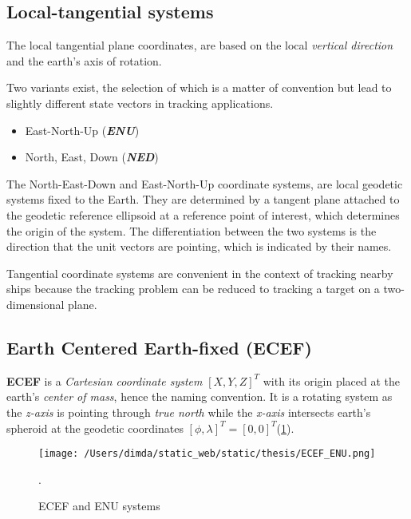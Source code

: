 \subsection{Local-tangential systems}

The local tangential plane coordinates, are based on the local \emph{vertical direction} and the earth's axis of rotation.

Two variants exist, the selection of which is a matter of convention but lead to slightly different state vectors in tracking applications.



\begin{itemize}
	\item East-North-Up (\textbf{\emph{ENU}})
	\item North, East, Down (\textbf{\emph{NED}})
\end{itemize}

The North-East-Down and East-North-Up coordinate systems, are local geodetic systems fixed to the Earth. They are determined by a tangent plane attached to the geodetic reference ellipsoid at a reference point of interest, which determines the origin of the system. The differentiation between the two systems is the direction that the unit vectors are pointing, which is indicated by their names.


Tangential coordinate systems are convenient in the context of tracking nearby ships because the tracking problem can be reduced to tracking a target on a two-dimensional plane.


\subsection{Earth Centered Earth-fixed (ECEF)}

\textbf{ECEF} is a \emph{Cartesian coordinate system} $[X,Y,Z]^T$ with its origin placed at the earth's \emph{center of mass}, hence the naming convention. It is a rotating system as the \emph{z-axis} is pointing through \emph{true north} while the \emph{x-axis} intersects earth's spheroid at the geodetic coordinates $[\phi,\lambda]^{T} =  [0,0]^{T}$(\cref{fig:ECEF_ENU}).


\begin{figure}[H]
	\centering
	\texttt{[image: /Users/dimda/static\_web/static/thesis/ECEF\_ENU.png]}
	\caption{ECEF and ENU systems \cite{WikipediaENUFig}}.
\label{fig:ECEF_ENU}
\end{figure}


